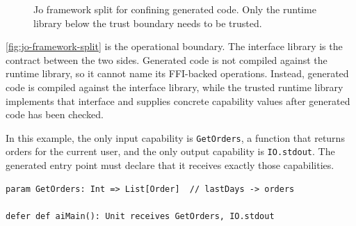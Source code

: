 \begin{figure}[t]
\centering
{}
\caption{Jo framework split for confining generated code. %
Only the runtime library below the trust boundary needs to be trusted.}
\label{fig:jo-framework-split}
\end{figure}

\autoref{fig:jo-framework-split} is the operational boundary. %
The interface library is the contract between the two sides. %
Generated code is not compiled against the runtime library, so it cannot name
its FFI-backed operations. %
Instead, generated code is compiled against the interface library, while the
trusted runtime library implements that interface and supplies concrete
capability values after generated code has been checked. %

In this example, the only input capability is \texttt{GetOrders}, a function
that returns orders for the current user, and the only output capability is
\texttt{IO.stdout}. %
The generated entry point must declare that it receives exactly those
capabilities. %

\begin{lstlisting}[style=pseudo]
param GetOrders: Int => List[Order]  // lastDays -> orders

defer def aiMain(): Unit receives GetOrders, IO.stdout
\end{lstlisting}

